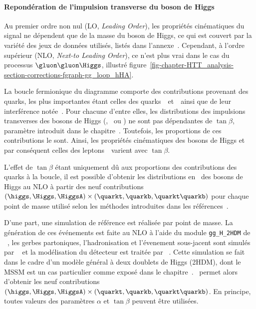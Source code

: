 \paragraph{Repondération de l'impulsion transverse du boson de Higgs}
Au premier ordre non nul (LO, \emph{Leading Order}), les propriétés cinématiques du signal ne dépendent que de la masse du boson de Higgs, ce qui est couvert par la variété des jeux de données utilisés, listés dans l'annexe~.
Cependant, à l'ordre supérieur (NLO, \emph{Next-to Leading Order}),
ce n'est plus vrai dans le cas du processus $\gluon\gluon\Higgs$,
illustré figure~\ref{fig-chapter-HTT_analysis-section-corrections-fgraph-gg_loop_hHA}.
\par
La boucle fermionique du diagramme comporte des contributions provenant des quarks,
les plus importantes étant celles des quarks~\quarkt\ et~\quarkb\ ainsi que de leur interférence notée~\quarkt\quarkb.
Pour chacune d'entre elles, les distributions des impulsions transverses des bosons de Higgs (\higgs, \Higgs\ ou \HiggsA) ne sont pas dépendantes de $\tan\beta$, paramètre introduit dans le chapitre~.
Toutefois, les proportions de ces contributions le sont.
Ainsi,
les propriétés cinématiques des bosons de Higgs
et par conséquent celles des leptons~\tau\
varient avec $\tan\beta$.
\par
L'effet de $\tan\beta$ étant uniquement dû aux proportions des contributions des quarks à la boucle,
il est possible d'obtenir les distributions en \pT\ des bosons de Higgs au NLO
à partir des neuf contributions $(\higgs,\Higgs,\HiggsA)\times(\quarkt,\quarkb,\quarkt\quarkb)$
pour chaque point de masse utilisé
selon les méthodes introduites dans les références~\cite{Bagnaschi:2015qta,Bagnaschi:2015bop}.
\par
D'une part, une simulation de référence est réalisée par point de masse.
La génération de ces événements est faite au NLO à l'aide du module \texttt{gg\_H\_2HDM} de \POWHEG~\cite{Alioli:2010xd},
les gerbes partoniques, l'hadronisation et l'évenement sous-jacent sont simulés par \PYTHIA~\cite{pythia8.2} et
la modélisation du détecteur est traitée par \GEANTfour~\cite{geant4_2003,geant4_2006,geant4_2016}.
Cette simulation se fait dans le cadre d'un modèle général à deux doublets de Higgs (2HDM), dont le MSSM est un cas particulier comme exposé dans le chapitre~.
\POWHEG\ permet alors d'obtenir les neuf contributions $(\higgs,\Higgs,\HiggsA)\times(\quarkt,\quarkb,\quarkt\quarkb)$.
En principe, toutes valeurs des paramètres $\alpha$ et $\tan\beta$ peuvent être utilisées.
